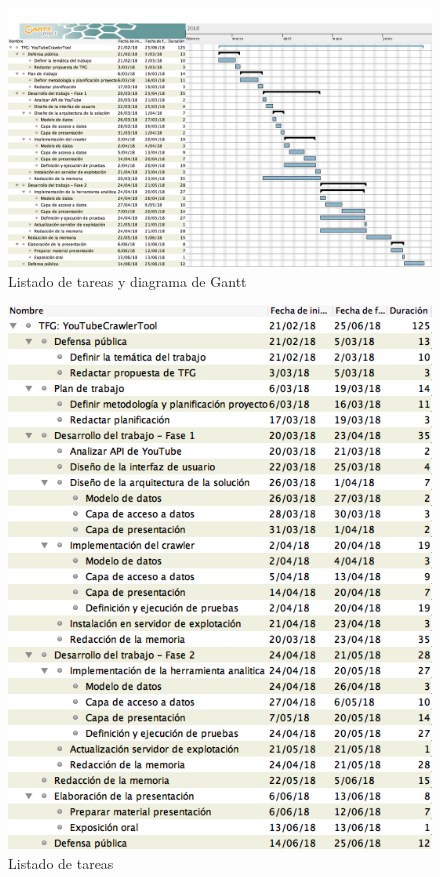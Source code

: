 \documentclass[11pt,a4paper]{article}
\begin{document}
\begin{figure}[H]
\centering
\includegraphics[scale=0.25]{planificacion/planificacion.png}
\caption{Listado de tareas y diagrama de Gantt}
\end{figure}

\begin{figure}[H]
\centering
\includegraphics[scale=0.4]{planificacion/listado-tareas.png}
\caption{Listado de tareas}
\end{figure}
\end{document}
